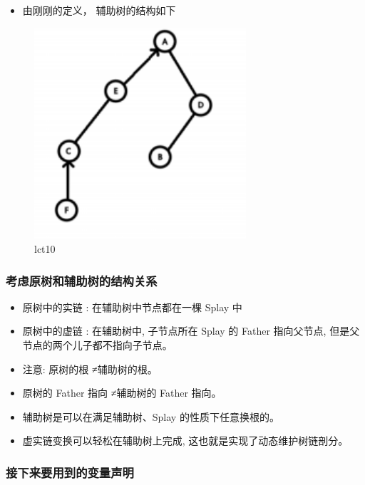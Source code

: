 \begin{itemize}
\item 由刚刚的定义， 辅助树的结构如下
\end{itemize}

\begin{figure}[htbp]
\centering
\includegraphics[width=0.7\textwidth]{docs/ds/images/lct10.png} 
\caption{lct10}
\end{figure}

\subsubsection{考虑原树和辅助树的结构关系}

\begin{itemize}
\item 原树中的实链 : 在辅助树中节点都在一棵 Splay 中
\item 原树中的虚链 : 在辅助树中, 子节点所在 Splay 的 Father 指向父节点, 但是父节点的两个儿子都不指向子节点。
\item 注意: 原树的根 ≠辅助树的根。
\item 原树的 Father 指向 ≠辅助树的 Father 指向。
\item 辅助树是可以在满足辅助树、Splay 的性质下任意换根的。
\item 虚实链变换可以轻松在辅助树上完成, 这也就是实现了动态维护树链剖分。
\end{itemize}

\subsubsection{接下来要用到的变量声明}

